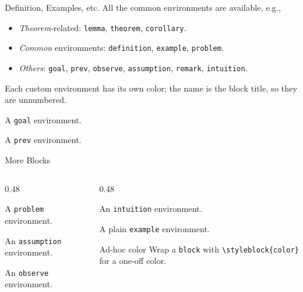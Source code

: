 \documentclass[aspectratio=169,10pt]{beamer}
\begin{document}
\begin{frame}{Definition, Examples, etc.}
    All the common environments are available, e.g.,
    \begin{itemize}
        \item \emph{Theorem}-related: \texttt{lemma}, \texttt{theorem}, \texttt{corollary}.
        \item \emph{Common} environments: \texttt{definition}, \texttt{example}, \texttt{problem}.
        \item \emph{Others}: \texttt{goal}, \texttt{prev}, \texttt{observe}, \texttt{assumption}, \texttt{remark}, \texttt{intuition}.
    \end{itemize}
    \pause
    \begin{remark}
        Each custom environment has its own color; the name is the block title, so they are unnumbered.
    \end{remark}
    \pause
    \begin{goal}
        A \texttt{goal} environment.
    \end{goal}
    \pause
    \begin{prev}
        A \texttt{prev} environment.
    \end{prev}
\end{frame}

\begin{frame}{More Blocks}
    \begin{columns}[t]
        \begin{column}{0.48\textwidth}
            \begin{problem}
                A \texttt{problem} environment.
            \end{problem}
            \begin{assumption}
                An \texttt{assumption} environment.
            \end{assumption}
            \begin{observe}
                An \texttt{observe} environment.
            \end{observe}
        \end{column}
        \begin{column}{0.48\textwidth}
            \begin{intuition}
                An \texttt{intuition} environment.
            \end{intuition}
            \begin{example}
                A plain \texttt{example} environment.
            \end{example}
            {%
                \begin{block}{Ad-hoc color}
                    Wrap a \texttt{block} with \texttt{\textbackslash styleblock\{color\}} for a one-off color.
                \end{block}}
        \end{column}
    \end{columns}
\end{frame}
\end{document}
